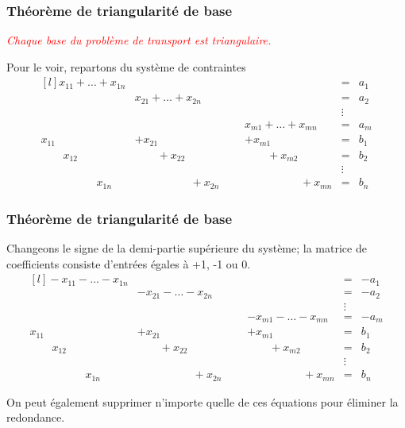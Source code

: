 \documentclass[usepdftitle=false, aspectratio=169]{beamer}
\begin{document}
\begin{frame}
\frametitle{Théorème de triangularité de base}

\textcolor{red}{\sl Chaque base du problème de transport est triangulaire.}

\mbox{}

Pour le voir, repartons du système de contraintes
\[
\begin{matrix}[l]
x_{11} + \ldots + x_{1n} & & & & = & a_1 \\
& x_{21} + \ldots + x_{2n} & & & = &  a_2 \\
& & & & \vdots \\
& & \mbox{ } & x_{m1} + \ldots + x_{mn} & = &  a_m \\
x_{11} & + x_{21} & & + x_{m1} & = & b_1 \\
\quad \quad x_{12} & \quad \quad + x_{22} & & \quad \quad + x_{m2} & = & b_2 \\
& & & & \vdots \\
\quad \quad \quad \qquad x_{1n} &  \quad \quad \quad \qquad +x_{2n} & &  \quad \quad \quad \qquad +x_{mn} & = & b_n 
\end{matrix}
\]

\end{frame}

\begin{frame}
\frametitle{Théorème de triangularité de base}

Changeons le signe de la demi-partie supérieure du système; la matrice de coefficients consiste d'entrées égales à +1, -1 ou 0.
\[
\begin{matrix}[l]
-x_{11} - \ldots - x_{1n} & & & & = & -a_1 \\
& -x_{21} - \ldots - x_{2n} & & & = &  -a_2 \\
& & & & \vdots \\
& & \mbox{ } & - x_{m1} - \ldots - x_{mn} & = &  -a_m \\
x_{11} & + x_{21} & & + x_{m1} & = & b_1 \\
\quad \quad x_{12} & \quad \quad + x_{22} & & \quad \quad + x_{m2} & = & b_2 \\
& & & & \vdots \\
\quad \quad \quad \qquad x_{1n} &  \quad \quad \quad \qquad +x_{2n} & &  \quad \quad \quad \qquad +x_{mn} & = & b_n 
\end{matrix}
\]

On peut également supprimer n'importe quelle de ces équations pour éliminer la redondance.

\end{frame}
\end{document}
